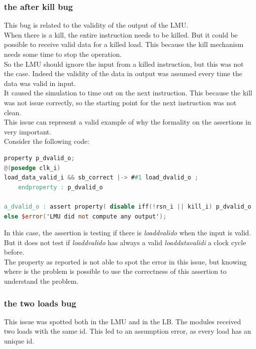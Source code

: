 \subsubsection{the after kill bug}
This bug is related to the validity of the output of the LMU.\\

When there is a kill, the entire instruction needs to be killed. But it could be possible to receive valid data for a killed load. This because the kill mechanism needs some time to stop the operation.\\

So the LMU should ignore the input from a killed instruction, but this was not the case. Indeed the validity of the data in output was assumed every time the data was valid in input.\\

It caused the simulation to time out on the next instruction. This because the kill was not issue correctly, so the starting point for the next instruction was not clean. \\

This issue can represent a valid example of why the formality on the assertions in very important.\\
Consider the following code:\\

\linespread{1}
\begin{lstlisting}[language=Verilog,style=verilog-style, backgroundcolor=\color{lyel_palette}, frame=tlb]
property p_dvalid_o;
@(posedge clk_i)
load_data_valid_i && sb_correct |-> ##1 load_dvalid_o ;
	endproperty : p_dvalid_o

a_dvalid_o : assert property( disable iff(!rsn_i || kill_i) p_dvalid_o )
else $error('LMU did not compute any output');
\end{lstlisting}
\linespread{1.2}

In this case, the assertion is testing if there is \emph{load\+dvalid\+o} when the input is valid. But it does not test if \emph{load\+dvalid\+o} has always a valid \emph{load\+data\+valid\+i} a clock cycle before.\\

The property as reported is not able to spot the error in this issue, but knowing where is the problem is possible to use the correctness of this assertion to understand the problem.\\

\subsubsection{the two loads bug}
This issue was spotted both in the LMU and in the LB. The modules received two loads with the same id. This led to an assumption error, as every load has an unique id.\\

